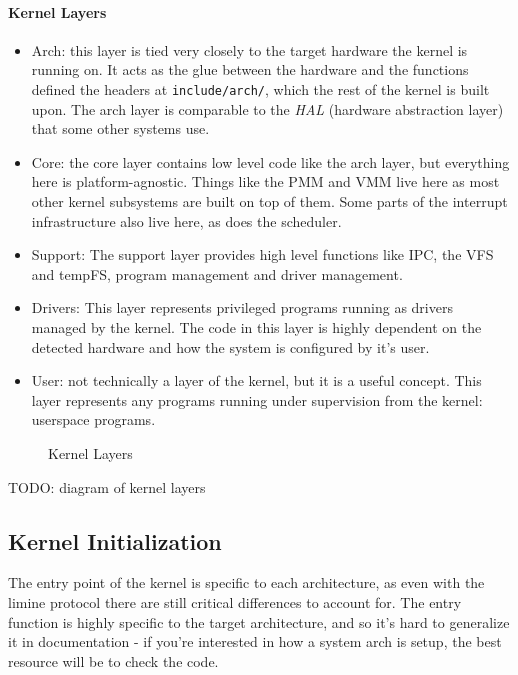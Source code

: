 \paragraph{Kernel Layers}
\begin{itemize}
    \item Arch: this layer is tied very closely to the target hardware the kernel is running on. It acts as the glue between the hardware and the functions defined the headers at \verb|include/arch/|, which the rest of the kernel is built upon. The arch layer is comparable to the \textit{HAL} (hardware abstraction layer) that some other systems use.
    \item Core: the core layer contains low level code like the arch layer, but everything here is platform-agnostic. Things like the PMM and VMM live here as most other kernel subsystems are built on top of them. Some parts of the interrupt infrastructure also live here, as does the scheduler.
    \item Support: The support layer provides high level functions like IPC, the VFS and tempFS, program management and driver management.
    \item Drivers: This layer represents privileged programs running as drivers managed by the kernel. The code in this layer is highly dependent on the detected hardware and how the system is configured by it's user.
    \item User: not technically a layer of the kernel, but it is a useful concept. This layer represents any programs running under supervision from the kernel: userspace programs.
\end{itemize}

\begin{figure}[h]
\centering
{}
\caption{Kernel Layers}
\end{figure}
TODO: diagram of kernel layers

\subsection{Kernel Initialization}
The entry point of the kernel is specific to each architecture, as even with the limine protocol there are still critical differences to account for. The entry function is highly specific to the target architecture, and so it's hard to generalize it in documentation - if you're interested in how a system arch is setup, the best resource will be to check the code.

